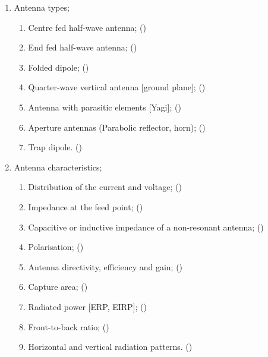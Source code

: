 \begin{flushleft}
\begin{enumerate}
\begin{enumerate}
\item Antenna types;
\begin{enumerate}
\item Centre fed half-wave antenna; ()\label{HAREC.a.6.1.1}
\item End fed half-wave antenna; ()\label{HAREC.a.6.1.2}
\item Folded dipole; ()\label{HAREC.a.6.1.3}
\item Quarter-wave vertical antenna [ground plane];
  ()\label{HAREC.a.6.1.4}
\item Antenna with parasitic elements [Yagi];
  ()\label{HAREC.a.6.1.5}
\item Aperture antennas (Parabolic reflector, horn);
  ()\label{HAREC.a.6.1.6}
\item Trap dipole. ()\label{HAREC.a.6.1.7}
\end{enumerate}

\item Antenna characteristics;
\begin{enumerate}
\item Distribution of the current and voltage;
  ()\label{HAREC.a.6.2.1}
\item Impedance at the feed point;
  ()\label{HAREC.a.6.2.2}
\item Capacitive or inductive impedance of a non-resonant antenna;
  ()\label{HAREC.a.6.2.3}
\item Polarisation; ()\label{HAREC.a.6.2.4}
\item Antenna directivity, efficiency and gain;
  ()\label{HAREC.a.6.2.5}
\item Capture area; ()\label{HAREC.a.6.2.6}
\item Radiated power [ERP, EIRP]; ()\label{HAREC.a.6.2.7}
\item Front-to-back ratio; ()\label{HAREC.a.6.2.8}
\item Horizontal and vertical radiation patterns.
  ()\label{HAREC.a.6.2.9}
\end{enumerate}


\end{enumerate}
\end{enumerate}
\end{flushleft}
